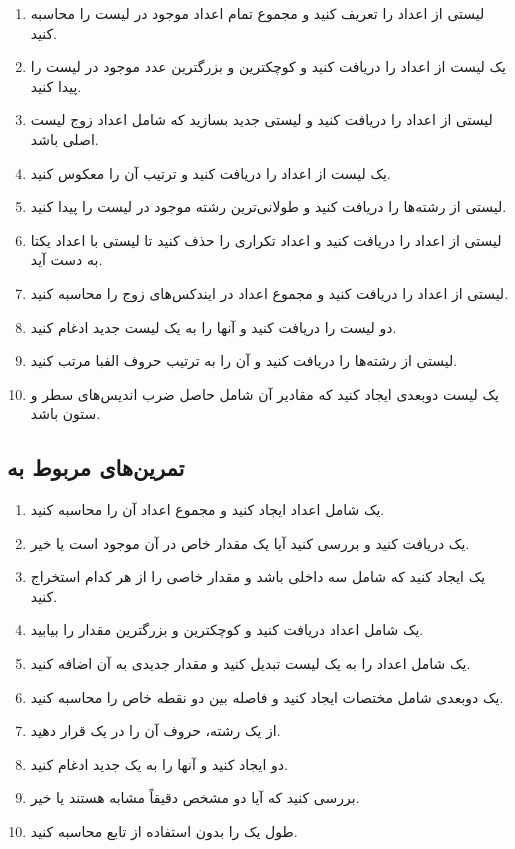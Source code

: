 \documentclass[a4paper,12pt]{article}
\begin{document}
	\begin{enumerate}
		\item لیستی از اعداد را تعریف کنید و مجموع تمام اعداد موجود در لیست را محاسبه کنید.
		\item یک لیست از اعداد را دریافت کنید و کوچکترین و بزرگترین عدد موجود در لیست را پیدا کنید.
		\item لیستی از اعداد را دریافت کنید و لیستی جدید بسازید که شامل اعداد زوج لیست اصلی باشد.
		\item یک لیست از اعداد را دریافت کنید و ترتیب آن را معکوس کنید.
		\item لیستی از رشته‌ها را دریافت کنید و طولانی‌ترین رشته موجود در لیست را پیدا کنید.
		\item لیستی از اعداد را دریافت کنید و اعداد تکراری را حذف کنید تا لیستی با اعداد یکتا به دست آید.
		\item لیستی از اعداد را دریافت کنید و مجموع اعداد در ایندکس‌های زوج را محاسبه کنید.
		\item دو لیست را دریافت کنید و آنها را به یک لیست جدید ادغام کنید.
		\item لیستی از رشته‌ها را دریافت کنید و آن را به ترتیب حروف الفبا مرتب کنید.
		\item یک لیست دو‌بعدی ایجاد کنید که مقادیر آن شامل حاصل ضرب اندیس‌های سطر و ستون باشد.
	\end{enumerate}
	
	\subsection*{تمرین‌های مربوط به }
	
	\begin{enumerate}
		\item یک  شامل اعداد ایجاد کنید و مجموع اعداد آن را محاسبه کنید.
		\item یک  دریافت کنید و بررسی کنید آیا یک مقدار خاص در آن موجود است یا خیر.
		\item یک  ایجاد کنید که شامل سه  داخلی باشد و مقدار خاصی را از هر کدام استخراج کنید.
		\item یک  شامل اعداد دریافت کنید و کوچکترین و بزرگترین مقدار را بیابید.
		\item یک  شامل اعداد را به یک لیست تبدیل کنید و مقدار جدیدی به آن اضافه کنید.
		\item یک  دو‌بعدی شامل مختصات ایجاد کنید و فاصله بین دو نقطه خاص را محاسبه کنید.
		\item از یک رشته، حروف آن را در یک  قرار دهید.
		\item دو  ایجاد کنید و آنها را به یک  جدید ادغام کنید.
		\item بررسی کنید که آیا دو  مشخص دقیقاً مشابه هستند یا خیر.
		\item طول یک  را بدون استفاده از تابع  محاسبه کنید.
	\end{enumerate}
	
\end{document}
